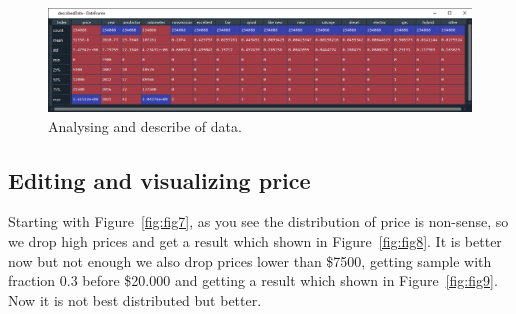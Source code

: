 \documentclass[onecolumn]{article}
\begin{document}
\begin{figure}[H]
\centering
    \includegraphics[width=.7\linewidth]{figures/Figure6.png}
\caption{\label{fig:fig6}
Analysing and describe of data.}
\end{figure}

\subsection{Editing and visualizing price}
Starting with Figure~\ref{fig:fig7}, as you see the distribution of price is non-sense, so we drop high prices and get a result which shown in Figure~\ref{fig:fig8}. It is better now but not enough we also drop prices lower than \$7500, getting sample with fraction 0.3 before \$20.000 and getting a result which shown in Figure~\ref{fig:fig9}. Now it is not best distributed but better.

\begin{figure}[H]
\centering
{}
\caption{}
\end{figure}
\end{document}
